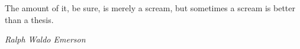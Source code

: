 \vspace*{6cm}

{\LARGE The amount of it, be sure, is merely a scream, but sometimes a scream is better than a thesis.}

\hfill {\large \emph{Ralph Waldo Emerson}}
